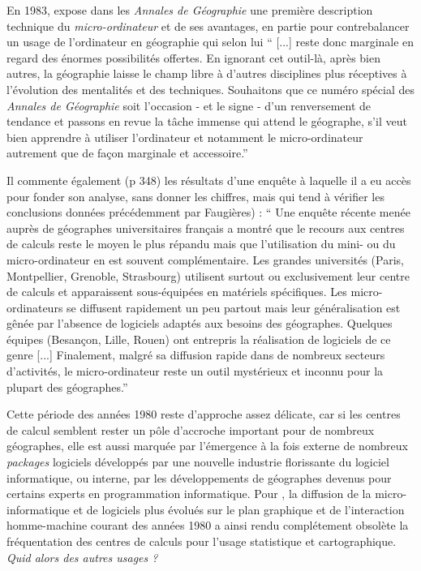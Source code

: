 En 1983, \textcite[367]{Lecarpentier1983} expose dans les \textit{Annales de Géographie} une première description technique du \textit{micro-ordinateur} et de ses avantages, en partie pour contrebalancer un usage de l'ordinateur en géographie qui selon lui \enquote{ [...] reste donc marginale en regard des énormes possibilités offertes. En ignorant cet outil-là, après bien autres, la géographie laisse le champ libre à d'autres disciplines plus réceptives à l'évolution des mentalités et des techniques. Souhaitons que ce numéro spécial des \textit{Annales de Géographie} soit l'occasion - et le signe - d'un renversement de tendance et passons en revue la tâche immense qui attend le géographe, s'il veut bien apprendre à utiliser l'ordinateur et notamment le micro-ordinateur autrement que de façon marginale et accessoire.}

Il commente également (p 348) les résultats d'une enquête à laquelle il a eu accès pour fonder son analyse, sans donner les chiffres, mais qui tend à vérifier les conclusions données précédemment par Faugières) : \enquote{ Une enquête récente menée auprès de géographes universitaires français a montré que le recours aux centres de calculs reste le moyen le plus répandu mais que l'utilisation du mini- ou du micro-ordinateur en est souvent complémentaire. Les grandes universités (Paris, Montpellier,  Grenoble, Strasbourg) utilisent surtout ou exclusivement leur centre de calculs et apparaissent sous-équipées en matériels spécifiques. Les micro-ordinateurs se diffusent rapidement un peu partout mais leur généralisation est gênée par l'absence de logiciels adaptés aux besoins des géographes. Quelques équipes (Besançon, Lille, Rouen) ont entrepris la réalisation de logiciels de ce genre [...] Finalement, malgré sa diffusion rapide dans de nombreux secteurs d'activités, le micro-ordinateur reste un outil mystérieux et inconnu pour la plupart des géographes.}

Cette période des années 1980 reste d'approche assez délicate, car si les centres de calcul semblent rester un pôle d'accroche important pour de nombreux géographes, elle est aussi marquée par l’émergence à la fois externe de nombreux \textit{packages} logiciels développés par une nouvelle industrie florissante du logiciel informatique, ou interne, par les développements de géographes devenus pour certains experts en programmation informatique. Pour \autocites[444]{Joliveau2004}{Waniez2010}, la diffusion de la micro-informatique et de logiciels plus évolués sur le plan graphique et de l’interaction homme-machine courant des années 1980 a ainsi rendu complétement obsolète la fréquentation des centres de calculs pour l’usage statistique et cartographique. \textit{Quid alors des autres usages ?}

